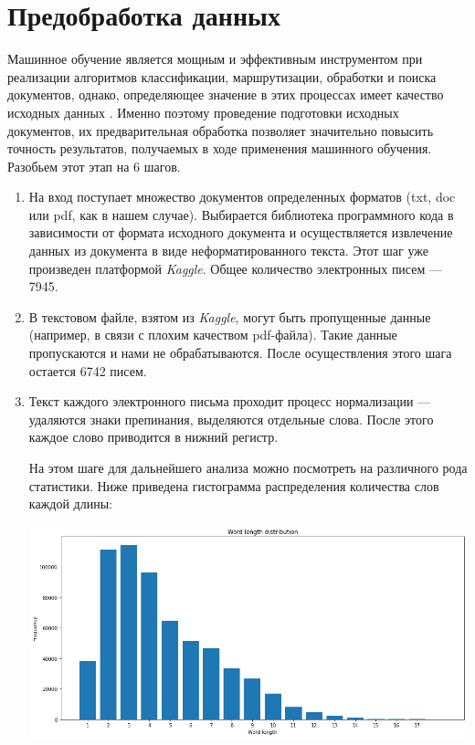 \chapter{Предобработка данных}

Машинное обучение является мощным и эффективным инструментом при реализации
алгоритмов классификации, маршрутизации, обработки и поиска документов, однако, определяющее значение в этих процессах имеет качество исходных данных \cite{bib2}. Именно поэтому проведение подготовки исходных документов, их предварительная обработка позволяет значительно повысить точность результатов, получаемых в ходе применения
машинного обучения. Разобьем этот этап на 6 шагов.

\begin{enumerate}

\item На вход поступает множество документов определенных форматов (txt, doc или pdf, как в нашем случае). Выбирается библиотека программного кода в зависимости от формата исходного документа и осуществляется извлечение данных из документа в виде неформатированного текста. Этот шаг уже произведен платформой \textit{Kaggle}. Общее количество электронных писем --- 7945.

\item В текстовом файле, взятом из \textit{Kaggle}, могут быть пропущенные данные (например, в связи с плохим качеством pdf-файла). Такие данные пропускаются и нами не обрабатываются. После осуществления этого шага остается 6742 писем. 

\item Текст каждого электронного письма проходит процесс нормализации --- удаляются знаки препинания, выделяются отдельные слова. После этого каждое слово приводится в нижний регистр. 

На этом шаге для дальнейшего анализа можно посмотреть на различного рода статистики.
Ниже приведена гистограмма распределения количества слов каждой длины: 

\includegraphics[scale=0.5]{word_lengths.png}


\end{enumerate}

